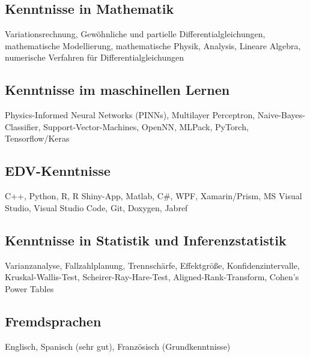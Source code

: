 \documentclass[12pt,a4paper]{article}
\begin{document}
\subsection*{Kenntnisse in Mathematik}
Variationsrechnung, Gewöhnliche und partielle Differentialgleichungen, mathematische Modellierung, mathematische Physik, Analysis, Lineare Algebra, numerische Verfahren für Differentialgleichungen
%
\subsection*{Kenntnisse im maschinellen Lernen}
Physics-Informed Neural Networks (PINNs), Multilayer Perceptron, Naive-Bayes-Classifier, Support-Vector-Machines, OpenNN, MLPack, PyTorch, Tensorflow/Keras
%
\subsection*{EDV-Kenntnisse}
C++, Python, R, R Shiny-App, Matlab, C\#, WPF, Xamarin/Prism, MS Visual Studio, Visual Studio Code, Git, Doxygen, Jabref
%
\subsection*{Kenntnisse in Statistik und Inferenzstatistik}
Varianzanalyse, Fallzahlplanung, Trennschärfe, Effektgröße, Konfidenzintervalle, Kruskal-Wallis-Test, Scheirer-Ray-Hare-Test, Aligned-Rank-Transform, Cohen's Power Tables
%

\subsection*{Fremdsprachen}
Englisch, Spanisch (sehr gut), Französisch (Grundkenntnisse)\\

\newpage
\pagestyle{empty}

\end{document}
